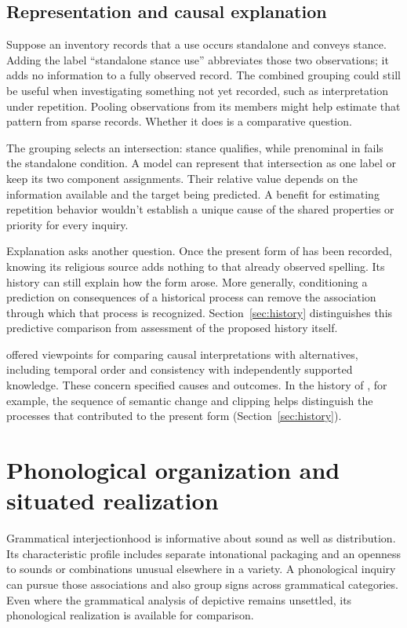 \documentclass[12pt]{article}
\begin{document}
\subsection{Representation and causal explanation}

Suppose an inventory records that a use occurs standalone and conveys
stance. Adding the label \enquote{standalone stance use} abbreviates
those two observations; it adds no information to a fully observed
record. The combined grouping could still be useful when investigating
something not yet recorded, such as interpretation under repetition.
Pooling observations from its members might help estimate that pattern
from sparse records. Whether it does is a comparative question.

The grouping selects an intersection: stance  qualifies,
while prenominal  in  fails the
standalone condition. A model can represent that intersection as one
label or keep its two component assignments. Their relative value
depends on the information available and the target being predicted.
A benefit for estimating repetition behavior wouldn't establish a
unique cause of the shared properties or priority for every inquiry.

Explanation asks another question. Once the present form of 
has been recorded, knowing its religious source adds nothing to that
already observed spelling. Its history can still explain how the form
arose. More generally, conditioning a prediction on consequences of a
historical process can remove the association through which that process
is recognized. Section~\ref{sec:history} distinguishes this predictive
comparison from assessment of the proposed history itself.

\textcite[295--299]{hill1965} offered viewpoints for comparing causal
interpretations with alternatives, including temporal order and consistency
with independently supported knowledge. These concern specified causes
and outcomes. In the history of , for example, the
sequence of semantic change and clipping helps distinguish the processes
that contributed to the present form (Section~\ref{sec:history}).

\section{Phonological organization and situated realization}\label{sec:phonology}

Grammatical interjectionhood is informative about sound as well as
distribution. Its characteristic profile includes separate intonational
packaging and an openness to sounds or combinations unusual elsewhere
in a variety. A phonological inquiry can pursue those associations
and also group signs across grammatical categories. Even where the
grammatical analysis of depictive  remains unsettled,
its phonological realization is available for comparison.
\end{document}
